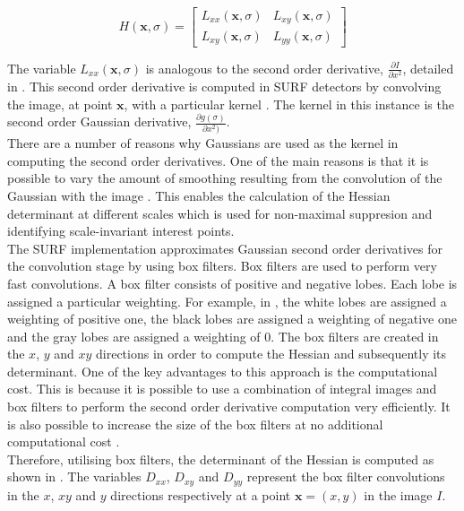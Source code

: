\documentclass{article}
\begin{document}
\begin{equation}
H(\textbf{x}, \sigma) = \left[ \begin{array}{cc} L_{xx}(\textbf{x}, \sigma) & L_{xy}(\textbf{x}, \sigma)\\
					    L_{xy}(\textbf{x}, \sigma) & L_{yy}(\textbf{x}, \sigma)\end{array} \right]
\label{eqn:hessianScale}
\end{equation}

The variable $L_{xx}(\textbf{x}, \sigma)$ is analogous to the second order derivative, $ \frac{\partial I}{\partial x^2}$, detailed in . This second order derivative is computed in SURF detectors by convolving the image, at point $\textbf{x}$, with a particular kernel \cite{Evans2009}. The kernel in this instance is the second order Gaussian derivative, $\frac{\partial g(\sigma)}{\partial x^2)}$. \\

There are a number of reasons why Gaussians are used as the kernel in computing the second order derivatives. One of the main reasons is that it is possible to vary the amount of smoothing resulting from the convolution of the Gaussian with the image \cite{Evans2009}. This enables the calculation of the Hessian determinant at different scales which is used for non-maximal suppresion and identifying scale-invariant interest points.\\

The SURF implementation approximates Gaussian second order derivatives for the convolution stage by using box filters. Box filters are used to perform very fast convolutions. A box filter consists of positive and negative lobes. Each lobe is assigned a particular weighting. For example, in , the white lobes are assigned a weighting of positive one, the black lobes are assigned a weighting of negative one and the gray lobes are assigned a weighting of 0. The box filters are created in the $x$, $y$ and $xy$ directions in order to compute the Hessian and subsequently its determinant. One of the key advantages to this approach is the computational cost. This is because it is possible to use a combination of integral images and box filters to perform the second order derivative computation very efficiently. It is also possible to increase the size of the box filters at no additional computational cost \cite{Bay2008}.\\

Therefore, utilising box filters, the determinant of the Hessian is computed as shown in . The variables $D_{xx}$, $D_{xy}$ and $D_{yy}$ represent the box filter convolutions in the $x$, $xy$ and $y$ directions respectively at a point $\textbf{x} = (x,y)$ in the image $I$.\\ 
\end{document}

